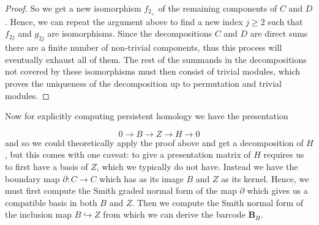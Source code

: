 \begin{proof}
  So we get a new isomorphism $f_{2_{+}}$ of the remaining components of $C$ and $D$. Hence, we can repeat the argument above to find a new index $j \geq 2$ such that $f_{2j}$ and $g_{2j}$ are isomorphisms. Since the decompositions $C$ and $D$ are direct sums there are a finite number of non-trivial components, thus this process will eventually exhaust all of them. The rest of the summands in the decompositions not covered by these isomorphisms must then consist of trivial modules, which proves the uniqueness of the decomposition up to permutation and trivial modules.
\end{proof}
Now for explicitly computing persistent homology we have the presentation

\[
  0 \to B \to Z \to H \to 0
\]
and so we could theoretically apply the proof above and get a decomposition of $H$, but this comes with one caveat: to give a presentation matrix of $H$ requires us to first have a basis of $Z$, which we typically do not have. Instead we have the boundary map $\partial: C \to C$ which has as its image $B$ and $Z$ as its kernel. Hence, we must first compute the Smith graded normal form of the map $\partial$ which gives us a compatible basis in both $B$ and $Z$. Then we compute the Smith normal form of the inclusion map $B \hookrightarrow Z$ from which we can derive the barcode $\mathbf{B}_{H}$.

